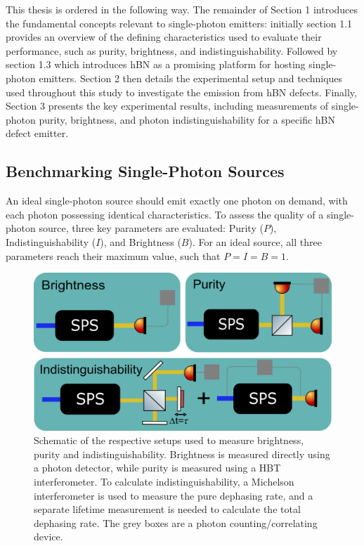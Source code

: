 This thesis is ordered in the following way. The remainder of Section 1 introduces the fundamental concepts relevant to single-photon emitters: initially section 1.1 provides an overview of the defining characteristics used to evaluate their performance, such as purity, brightness, and indistinguishability. Followed by section 1.3 which introduces hBN as a promising platform for hosting single-photon emitters. Section 2 then details the experimental setup and techniques used throughout this study to investigate the emission from hBN defects. Finally, Section 3 presents the key experimental results, including measurements of single-photon purity, brightness, and photon indistinguishability for a specific hBN defect emitter.

\subsection{Benchmarking Single-Photon Sources}

An ideal single-photon source should emit exactly one photon on demand, with each photon possessing identical characteristics. To assess the quality of a single-photon source, three key parameters are evaluated: Purity ($P$), Indistinguishability ($I$), and Brightness ($B$). For an ideal source, all three parameters reach their maximum value, such that $ P = I = B = 1 $.

\begin{figure}[h]
    \centering
    \includegraphics[width=0.9\linewidth]{Figures/PIB.png}
    \caption{Schematic of the respective setups used to measure brightness, purity and indistinguishability. Brightness is measured directly using a photon detector, while purity is measured using a HBT interferometer. To calculate indistinguishability, a Michelson interferometer is used to measure the pure dephasing rate, and a separate lifetime measurement is needed to calculate the total dephasing rate. The grey boxes are a photon counting/correlating device.}
    \label{fig:PIB}
\end{figure}

